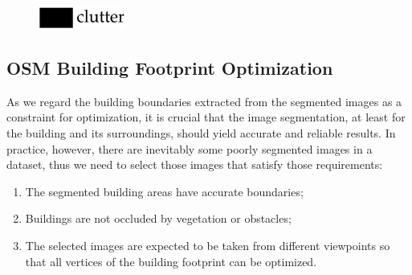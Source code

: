 \documentclass[remotesensing,article,accept,moreauthors,pdftex,10pt,a4paper]{mdpi}
\theoremstyle{mdpi}
\newcounter{ex}
\newcounter{re}
\begin{document}
\begin{figure}[H]
      \protect\includegraphics[scale=1]{fig7.pdf}
       \caption{}       
       \label{fig:seg}
\end{figure}

\subsection{OSM Building Footprint Optimization}
As we regard the building boundaries extracted from the segmented images as a constraint for optimization, it is crucial that the image segmentation, at least for the building and its surroundings, should yield accurate and reliable results. In practice, however, there are inevitably some poorly segmented images in a dataset, thus we need to select those images that satisfy those requirements: 
\begin{enumerate}[leftmargin=*,labelsep=5.5mm]
\item The segmented building areas have accurate boundaries; 
\item Buildings are not occluded by vegetation or obstacles;
\item The selected images are expected to be taken from different viewpoints so that all vertices of the building footprint can be optimized.
\end{enumerate}
  
\end{document}

